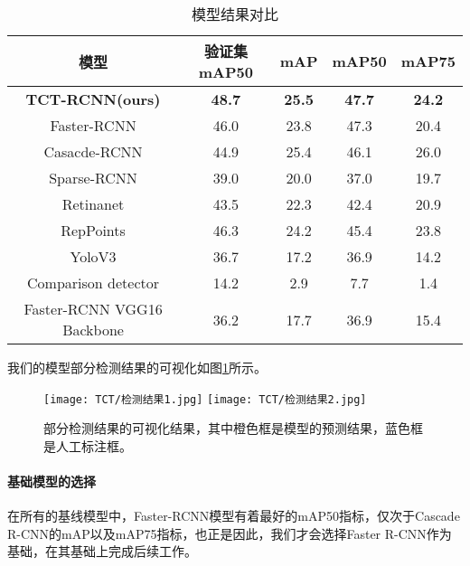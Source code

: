 \begin{table}[htbp]
    \centering
    \caption{模型结果对比}
    \begin{tabular}{|c|c|c|c|c|}
        \hline
        模型                       & 验证集mAP50   & mAP           & mAP50         & mAP75         \\ \hline
        \textbf{TCT-RCNN(ours)}    & \textbf{48.7} & \textbf{25.5} & \textbf{47.7} & \textbf{24.2} \\ \hline
        Faster-RCNN                & 46.0          & 23.8          & 47.3          & 20.4          \\ \hline
        Casacde-RCNN               & 44.9          & 25.4          & 46.1          & 26.0          \\ \hline
        Sparse-RCNN                & 39.0          & 20.0          & 37.0          & 19.7          \\ \hline
        Retinanet                  & 43.5          & 22.3          & 42.4          & 20.9          \\ \hline
        RepPoints                  & 46.3          & 24.2          & 45.4          & 23.8          \\ \hline
        YoloV3                     & 36.7          & 17.2          & 36.9          & 14.2          \\ \hline
        Comparison detector        & 14.2          & 2.9           & 7.7           & 1.4           \\ \hline
        Faster-RCNN VGG16 Backbone & 36.2          & 17.7          & 36.9          & 15.4          \\ \hline
    \end{tabular}
    \label{tab:模型结果对比}
\end{table}
\par 我们的模型部分检测结果的可视化如图\ref{pic:检测结果可视化}所示。
\begin{figure}[htb]
    \centering
    \texttt{[image: TCT/检测结果1.jpg]}
    \texttt{[image: TCT/检测结果2.jpg]}
    \caption{部分检测结果的可视化结果，其中橙色框是模型的预测结果，蓝色框是人工标注框。}
    \label{pic:检测结果可视化}
\end{figure}
\paragraph{基础模型的选择}
\par 在所有的基线模型中，Faster-RCNN模型有着最好的mAP50指标，仅次于Cascade R-CNN的mAP以及mAP75指标，也正是因此，我们才会选择Faster R-CNN作为基础，在其基础上完成后续工作。
